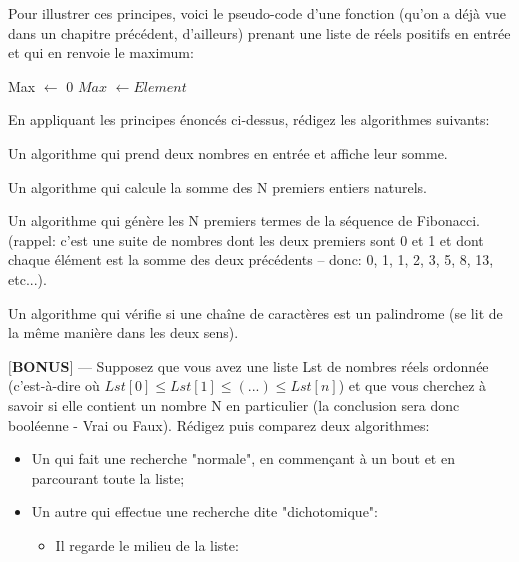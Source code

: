\documentclass[12pt]{article}
\begin{document}
	Pour illustrer ces principes, voici le pseudo-code d'une fonction (qu'on a déjà vue dans un chapitre précédent, d'ailleurs) prenant une liste de réels positifs en entrée et qui en renvoie le maximum:
	
	\vspace{\baselineskip}
	
	\begin{algorithmic}[1]
		\State Max $\leftarrow$ 0
		\State $Max$ $\leftarrow Element$
		\EndIf
		\EndFor
		\State{}
		\EndFunction
	\end{algorithmic}
	
		\begin{MonExo}
		En appliquant les principes énoncés ci-dessus, rédigez les algorithmes suivants:
		\begin{alphenum}
			\item Un algorithme qui prend deux nombres en entrée et affiche leur somme.
			\item Un algorithme qui calcule la somme des N premiers entiers naturels.
			\item Un algorithme qui génère les N premiers termes de la séquence de Fibonacci. (rappel: c'est une suite de nombres dont les deux premiers sont 0 et 1 et dont chaque élément est la somme des deux précédents -- donc: 0, 1, 1, 2, 3, 5, 8, 13, etc...).
			\item Un algorithme qui vérifie si une chaîne de caractères est un palindrome (se lit de la même manière dans les deux sens).
			\item \textbf{$[$BONUS$]$} --- Supposez que vous avez une liste Lst de nombres réels  ordonnée (c'est-à-dire où $Lst[0] \leq Lst[1] \leq (...) \leq Lst[n]$) et que vous cherchez à savoir si elle contient un nombre N en particulier (la conclusion sera donc booléenne - Vrai ou Faux). Rédigez puis comparez deux algorithmes:
			\begin{itemize}
				\item Un qui fait une recherche "normale", en commençant à un bout et en parcourant toute la liste;
				\item Un  autre qui effectue une recherche dite "dichotomique":
				\begin{itemize}
					\item Il regarde le milieu de la liste: 

\end{itemize}
\end{itemize}
\end{alphenum}
\end{MonExo}
\end{document}
